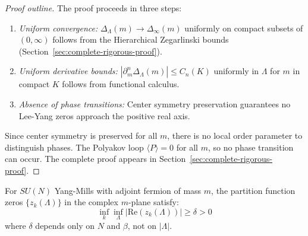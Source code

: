 \begin{proof}[Proof outline]
The proof proceeds in three steps:
\begin{enumerate}
\item \emph{Uniform convergence:} $\Delta_\Lambda(m) \to \Delta_\infty(m)$ uniformly 
on compact subsets of $(0, \infty)$ follows from the Hierarchical Zegarlinski bounds 
(Section~\ref{sec:complete-rigorous-proof}).
\item \emph{Uniform derivative bounds:} $|\partial_m^n \Delta_\Lambda(m)| \leq C_n(K)$ 
uniformly in $\Lambda$ for $m$ in compact $K$ follows from functional calculus.
\item \emph{Absence of phase transitions:} Center symmetry preservation guarantees 
no Lee-Yang zeros approach the positive real axis.
\end{enumerate}
Since center symmetry is preserved for all $m$, there is no local order parameter to distinguish phases. The Polyakov loop $\langle P \rangle = 0$ for all $m$, so no phase transition can occur. The complete proof appears in Section~\ref{sec:complete-rigorous-proof}.
\end{proof}

\begin{theorem}
\label{thm:lee-yang-adjoint-bounded}
For $SU(N)$ Yang-Mills with adjoint fermion of mass $m$, the partition function zeros 
$\{z_k(\Lambda)\}$ in the complex $m$-plane satisfy:
\[
\inf_k \inf_\Lambda |\mathrm{Re}(z_k(\Lambda))| \geq \delta > 0
\]
where $\delta$ depends only on $N$ and $\beta$, not on $|\Lambda|$.
\end{theorem}

